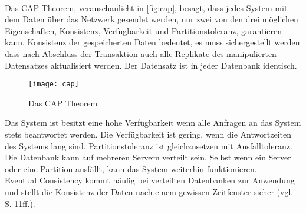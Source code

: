 \\
Das \gls{CAP} Theorem, veranschaulicht in \autoref{fig:cap}, besagt, dass jedes System mit dem Daten über das Netzwerk gesendet werden, nur zwei von den drei möglichen Eigenschaften, Konsistenz, Verfügbarkeit und Partitionstoleranz, garantieren kann.
Konsistenz der gespeicherten Daten bedeutet, es muss sichergestellt werden dass nach Abschluss der Transaktion auch alle Replikate des manipulierten Datensatzes aktualisiert werden. Der Datensatz ist in jeder Datenbank identisch.
%
\begin{figure}[H]
  \centering
  \texttt{[image: cap]}
  \grayRule
  \caption{Das CAP Theorem}
  \label{fig:cap}
\end{figure}
%
Das System ist besitzt eine hohe Verfügbarkeit wenn alle Anfragen an das System stets beantwortet werden. Die Verfügbarkeit ist gering, wenn die Antwortzeiten des Systems lang sind.
Partitionstoleranz ist gleichzusetzen mit Ausfalltoleranz. Die Datenbank kann auf mehreren Servern verteilt sein. Selbst wenn ein Server oder eine Partition ausfällt, kann das System weiterhin funktionieren.\\
Eventual Consistency kommt häufig bei verteilten Datenbanken zur Anwendung und stellt die Konsistenz der Daten nach einem gewissen Zeitfenster sicher (vgl. ~\cite{couchDB} S. 11ff.). 
